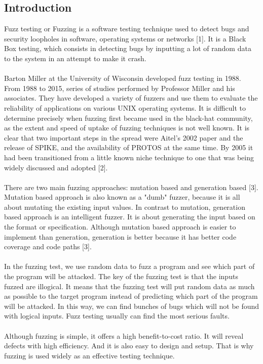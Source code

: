 \documentclass[twoside]{article}
\begin{document}
\begin{multicols}{2}
\section{Introduction}

Fuzz testing or Fuzzing is a software testing technique used to detect bugs and security loopholes in software, operating systems or networks [1]. It is a Black Box testing, which consists in detecting bugs by inputting a lot of random data to the system in an attempt to make it crash.
\\\\
\noindent
Barton Miller at the University of Wisconsin developed fuzz testing in 1988. From 1988 to 2015, series of studies performed by Professor Miller and his associates. They have developed a variety of fuzzers and use them to evaluate the reliability of applications on various UNIX operating systems. It is difficult to determine precisely when fuzzing first became used in the black-hat community, as the extent and speed of uptake of fuzzing techniques is not well known. It is clear that two important steps in the spread were Aitel's 2002 paper and the release of SPIKE, and the availability of PROTOS at the same time. By 2005 it had been transitioned from a little known niche technique to one that was being widely discussed and adopted [2].
\\\\
\noindent
There are two main fuzzing approaches: mutation based and generation based [3]. Mutation based approach is also known as a "dumb" fuzzer, because it is all about mutating the existing input values. In contrast to mutation, generation based approach is an intelligent fuzzer. It is about generating the input based on the format or specification. Although mutation based approach is easier to implement than generation, generation is better because it has better code coverage and code paths [3].
\\\\
\noindent
In the fuzzing test, we use random data to fuzz a program and see which part of the program will be attacked. The key of the fuzzing test is that the inputs fuzzed are illogical. It means that the fuzzing test will put random data as much as possible to the target program instead of predicting which part of the program will be attacked. In this way, we can find bunches of bugs which will not be found with logical inputs. Fuzz testing usually can find the most serious faults.
\\\\
\noindent
Although fuzzing is simple, it offers a high benefit-to-cost ratio. It will reveal defects with high efficiency. And it is also easy to design and setup. That is why fuzzing is used widely as an effective testing technique.


\end{multicols}
\end{document}
